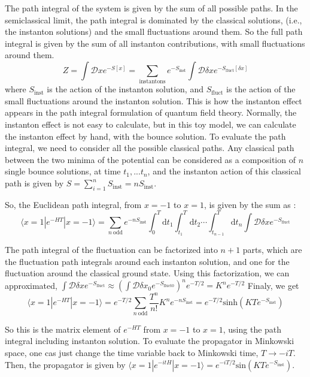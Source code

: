 \documentclass{article}
\begin{document}
The path integral of the system is given by the sum of all possible paths. In the semiclassical limit, the path integral is dominated by the classical solutions, (i.e., the instanton solutions) and the small fluctuations around them.
So the full path integral is given by the sum of all instanton contributions, with small fluctuations around them.
\begin{equation}
    Z = \int \mathcal{D}x e^{-S[x]} = \sum_{\text{instantons}} e^{-S_{\text{inst}}} \int \mathcal{D}\delta x e^{-S_{\text{fluct}}[\delta x]}
\end{equation}
where $S_{\text{inst}}$ is the action of the instanton solution, and $S_{\text{fluct}}$ is the action of the small fluctuations around the instanton solution.
This is how the instanton effect appears in the path integral formulation of quantum field theory. Normally, the instanton effect is not easy to calculate, but in this toy model, we can calculate the instanton effect by hand, with the bounce solution.
To evaluate the path integral, we need to consider all the possible classical paths.
Any classical path between the two minima of the potential can be considered as a composition of $n$ single bounce solutions, at time $t_1, ... t_n$, and the instanton action of this classical path is given by $S = \sum_{i=1}^n S_{\text{inst}}=nS_{\text{inst}}$.

So, the Euclidean path integral, from $x = -1$ to $x = 1$, is given by the sum as :
\begin{equation}
    \langle x = 1 | e^{-HT} | x = -1 \rangle = \sum_{n \ \text{odd}} e^{-nS_{\text{inst}}} \int_{0}^T \text{d}t_1 \int_{t_1}^T \text{d}t_2 \cdots \int_{t_{n-1}}^T \text{d}t_n \int \mathcal{D}\delta x e^{-S_{\text{fluct}}}
\end{equation}

The path integral of the fluctuation can be factorized into $n+1$ parts, which are the fluctuation path integrals around each instanton solution, and one for the fluctuation around the classical ground state.
Using this factorization, we can approximated, $\int \mathcal{D}\delta x e^{-S_{\text{fluct}}} \approx \left( \int \mathcal{D}\delta x_0 e^{-S_{\text{fluct}0}} \right)^n e^{-T/2}=K^n e^{-T/2}$
Finaly, we get
\begin{equation}
    \langle x = 1 | e^{-HT} | x = -1 \rangle = e^{-T/2} \sum_{n \ \text{odd}} \frac{T^n}{n!} K^n e^{-nS_{\text{inst}}}= e^{-T/2}  \text{sinh}(KT e^{-S_{\text{inst}}})
\end{equation}

So this is the matrix element of $e^{-HT}$ from $x = -1$ to $x = 1$, using the path integral including instanton solution. 
To evaluate the propagator in Minkowski space, one cas just change the time variable back to Minkowski time, $T \rightarrow -iT$.
Then, the propagator is given by $\langle x = 1 | e^{-itH} | x = -1 \rangle = e^{-iT/2}  \text{sin}(KT e^{-S_{\text{inst}}})$.
\end{document}
